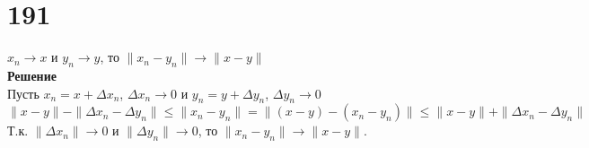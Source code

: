 \documentclass[a4paper]{article}
\begin{document}
\section*{191}
$x_n \to x$ и $y_n \to y$, то $\|x_n - y_n\| \to \|x-y\|$\\
\textbf{Решение}\\
Пусть $x_n = x + \Delta x_n$, $\Delta x_n \to 0$ и $y_n = y + \Delta y_n$, $\Delta y_n \to 0$\\
$\| x-y\| - \| \Delta x_n - \Delta y_n \| \le \|x_n - y_n\| = \|(x-y) - (x_n - y_n)\|\le \| x - y\| + \| \Delta x_n - \Delta y_n\|$\\
Т.к. $\|\Delta x_n\| \to 0$ и $\|\Delta y_n\| \to 0$, то $\|x_n-y_n\| \to \|x-y\|$.
\end{document}
